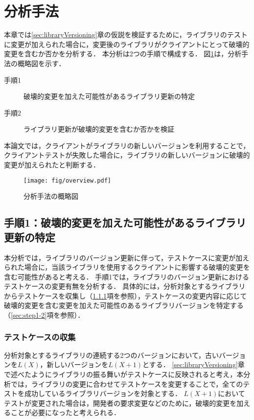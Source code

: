 \documentclass[submit]{ipsj}
\begin{document}
\section{分析手法}
\label{sec:analyticalMethod}

本章では\ref{sec:libraryVersioning}章の仮説を検証するために，ライブラリのテストに変更が加えられた場合に，変更後のライブラリがクライアントにとって破壊的変更を含むか否かを分析する．
本分析は2つの手順で構成する．
図\ref{fig:overview}は，分析手法の概略図を示す．

\begin{description}
\item[手順1] 破壊的変更を加えた可能性があるライブラリ更新の特定
\item[手順2] ライブラリ更新が破壊的変更を含むか否かを検証
\end{description}

本論文では，クライアントがライブラリの新しいバージョンを利用することで，クライアントテストが失敗した場合に，ライブラリの新しいバージョンに破壊的変更が加えられたと判断する．

\begin{figure}
  \centering
  \texttt{[image: fig/overview.pdf]}
  \caption{分析手法の概略図}
  \label{fig:overview}
\end{figure}

\subsection{手順1：破壊的変更を加えた可能性があるライブラリ更新の特定}
\label{sec:step1}
本分析では，ライブラリのバージョン更新に伴って，テストケースに変更が加えられた場合に，当該ライブラリを使用するクライアントに影響する破壊的変更を含む可能性があると考える．
手順1では，ライブラリのバージョン更新におけるテストケースの変更有無を分析する．
具体的には，分析対象とするライブラリからテストケースを収集し（\ref{sec:step1-1}項を参照），テストケースの変更内容に応じて破壊的変更を含む変更を加えた可能性のあるライブラリバージョンを特定する（\ref{sec:step1-2}項を参照）．

\subsubsection{テストケースの収集}
\label{sec:step1-1}

分析対象とするライブラリの連続する2つのバージョンにおいて，古いバージョンを$L(X)$，新しいバージョンを$L(X+1)$とする．
\ref{sec:libraryVersioning}章で述べたようにライブラリの振る舞いがテストケースに反映されると考え，本分析では，ライブラリの変更に合わせてテストケースを変更することで，全てのテストを成功しているライブラリバージョンを対象とする．
$L(X+1)$においてテストが変更された場合は，開発者の要求変更などのために，破壊的変更を加えることが必要になったと考えられる．
\end{document}
